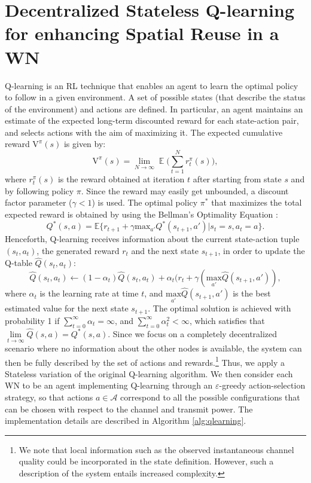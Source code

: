 \documentclass[conference]{IEEEtran}
\begin{document}
	\section{Decentralized Stateless Q-learning for enhancing Spatial Reuse in a WN}
	\label{section:qlearning}	
	Q-learning \cite{sutton1998reinforcement, watkins1992q} is an RL technique that enables an agent to learn the optimal policy to follow in a given environment. A set of possible states (that describe the status of the environment) and actions are defined. In particular, an agent maintains an estimate of the expected long-term discounted reward for each state-action pair, and selects actions with the aim of maximizing it. The expected cumulative reward $\text{V}^\pi(s)$ is given by:
	\begin{equation}
	\label{eq:ql_reward_policy}
	\text{V}^\pi(s) = \lim_{N \rightarrow \infty} \mathop{\mathbb{E}}\Big(\sum_{t=1}^{N} r_t^\pi(s)\Big),
	\nonumber
	\end{equation}
	where $r_t^\pi(s)$ is the reward obtained at iteration $t$ after starting from state $s$ and by following policy $\pi$. Since the reward may easily get unbounded, a discount factor parameter ($\gamma < 1$) is used. The optimal policy $\pi^*$ that maximizes the total expected reward is obtained by using the Bellman's Optimality Equation \cite{sutton1998reinforcement}:	
	\begin{equation}
	Q^*(s,a) = \mathbb{E} \Big\{r_{t+1} + \gamma \text{max}_{a'} Q^*(s_{t+1},a') | s_t = s, a_t = a\Big\}. \nonumber
	\end{equation}	
	Henceforth, Q-learning receives information about the current state-action tuple $(s_t,a_t)$, the generated reward $r_t$ and the next state $s_{t+1}$, in order to update the Q-table $\hat{Q}(s_t,a_t)$: 	
	\begin{equation}
	\hat{Q}(s_t,a_t)\leftarrow (1-\alpha_t) \hat{Q}(s_t,a_t) + \alpha_t (r_t + \gamma (\underset{a'}{\text{max}}\hat{Q}(s_{t+1},a')),
	\nonumber
	\end{equation}	
	where $\alpha_t$ is the learning rate at time $t$, and $\underset{a'}{\text{max}}\hat{Q}(s_{t+1},a')$ is the best estimated value for the next state $s_{t+1}$. The optimal solution is achieved with probability 1 if $\sum_{t=0}^{\infty} \alpha_t = \infty$, and $\sum_{t=0}^{\infty} \alpha_t^2 < \infty$, which satisfies that $\underset{t \rightarrow \infty}{\lim} \hat{Q}(s,a) = Q^*(s,a)$.
	Since we focus on a completely decentralized scenario where no information about the other nodes is available, the system can then be fully described by the set of actions and rewards.\footnote{We note that local information such as the observed instantaneous channel quality could be incorporated in the state definition. However, such a description of the system entails increased complexity.} Thus, we apply a Stateless variation of the original Q-learning algorithm. We then consider each WN to be an agent implementing Q-learning through an $\varepsilon$-greedy action-selection strategy, so that actions $a \in \mathcal{A}$ correspond to all the possible configurations that can be chosen with respect to the channel and transmit power. The implementation details are described in Algorithm \ref{alg:qlearning}.
		
\end{document}

